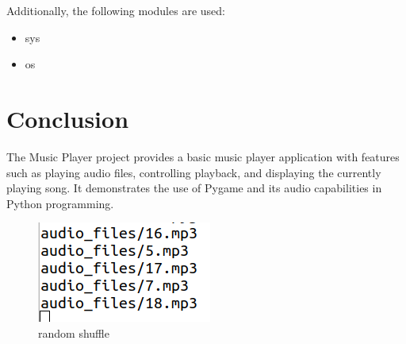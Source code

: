 \documentclass[journal,12pt,twocolumn]{IEEEtran}
\begin{document}
Additionally, the following modules are used:

\begin{itemize}
        \item sys
        \item os
\end{itemize}

\section{Conclusion}
The Music Player project provides a basic music player application with features such as playing audio files, controlling playback, and displaying the currently playing song. It demonstrates the use of Pygame and its audio capabilities in Python programming.

\begin{figure}
    \centering
    \includegraphics{audio.png}
    \caption{random shuffle}
    \label{fig:my_label}
\end{figure}
\end{document}

